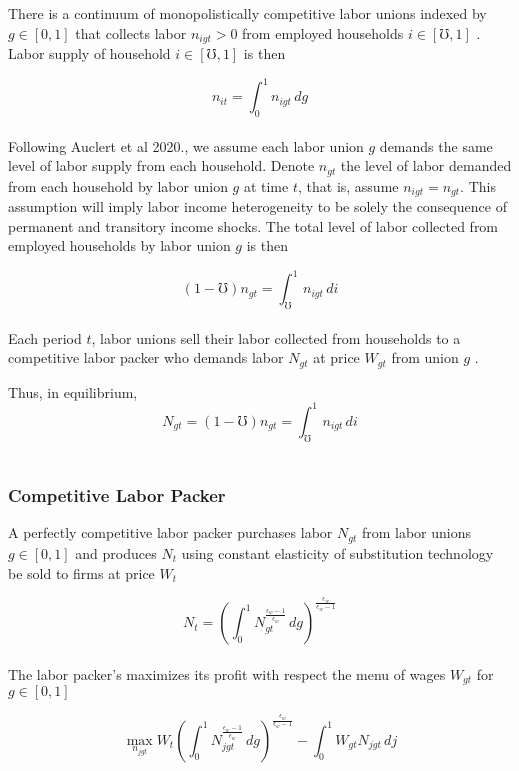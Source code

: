 \documentclass[titlepage]{\econtex}\providecommand{\texname}{BufferStockTheory}
\begin{document}
There is a continuum of monopolistically competitive labor unions indexed by $g \in [0,1]$ that collects labor $n_{igt} > 0$ from employed households $i \in [\mho,1]$ . Labor supply of household $i \in [\mho,1]$ is then

$$n_{it} = \int_{0}^{1} n_{igt}\,dg$$ \\

Following Auclert et al 2020., we assume each labor union $g$ demands the same level  of labor supply from each household. Denote $n_{gt}$ the level of labor demanded from each household by labor union $g$ at time $t$, that is,  assume  $n_{igt} =\mathit{n}_{gt}$. This assumption will imply labor income heterogeneity to be solely the consequence of  permanent and transitory income shocks.
The total level of labor collected from employed households  by labor union $g$  is then 

$$  (1-\mho) \mathit{n}_{gt} = \int_{\mho}^{1} n_{igt}\,di $$ \\

Each period $t$, labor unions sell their labor collected from households to a competitive labor packer who demands labor $N_{gt}$ at price $W_{gt}$ from union $g$ . 

Thus, in equilibrium, $$  N_{gt} = (1-\mho) \mathit{n}_{gt} = \int_{\mho}^{1} n_{igt}\,di $$  \\


\hypertarget{Competitive Labor Packer}{}
\subsubsection{Competitive Labor Packer}



A perfectly competitive labor packer purchases labor $N_{gt}$ from labor unions $g \in [0,1]$ and produces $N_{t}$ using constant elasticity of substitution technology be sold to firms at price $W_{t}$

 
$$ N_{t} = \left(\int_{0}^{1} N_{gt}^{\frac{\epsilon_{w}-1}{\epsilon_{w}}}\,dg\right)^{\frac{\epsilon_{w}}{\epsilon_{w}-1}}$$ \\

The labor packer's maximizes its profit with respect the menu of wages $W_{gt}$ for $ g \in  [0,1]$

$$ \max_{n_{jgt}} W_{t} \left(\int_{0}^{1} N_{jgt}^{\frac{\epsilon_{w}-1}{\epsilon_{w}}} \, dg \right)^ {\frac{\epsilon_{w}}{\epsilon_{w}-1}} - \int_{0}^{1} W_{gt}N_{jgt}\, dj $$ \\
\end{document}
